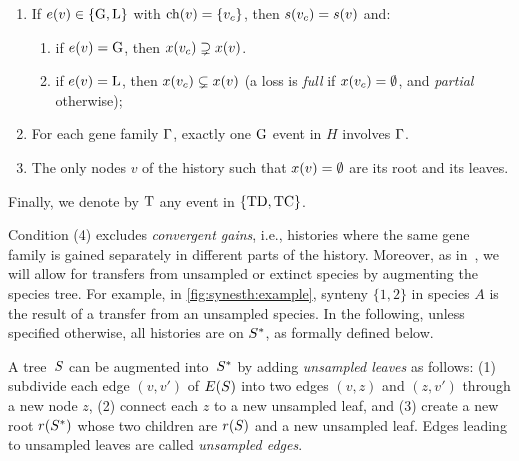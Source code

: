 \begin{definition}
\begin{enumerate}
        \item If \(e(v) \in \{\mathrm{G}, \mathrm{L}\}\)
            with \(\mathrm{ch}(v) = \{v_c\}\),
            then \(s(v_c) = s(v)\) and:

        \begin{enumerate}
            \item if \(e(v) = \mathrm{G}\),
                then \(x(v_c) \supsetneq x(v)\).
                
            \item if \(e(v) = \mathrm{L}\),
                then \(x(v_c) \subsetneq x(v)\)
                (a loss is \emph{full} if \(x(v_c) = \emptyset\),
                and \emph{partial} otherwise);
        \end{enumerate}

        \item\label{def:synesth:hist-gain-once}
            For each gene family \(\Gamma\), exactly one \(\mathrm{G}\) event in \(H\) involves \(\Gamma\).

        \item The only nodes \(v\) of the history such that \(x(v) = \emptyset\) are its root and its leaves.
    \end{enumerate}
    
    Finally, we denote by \(\mathrm{T}\) any event in \(\{\mathrm{TD}, \mathrm{TC}\}\).
\end{definition}

Condition (4) excludes \emph{convergent gains}, i.e., histories where the same gene family is gained separately in different parts of the history.
Moreover, as in~\textcite{Weiner2021ImprovedDuplicationTransfer}, we will allow for transfers from unsampled or extinct species by augmenting the species tree. For example, in \cref{fig:synesth:example}, synteny \(\{1,2\}\) in species \(A\) is the result of a transfer from an unsampled species.
In the following, unless specified otherwise, all histories are on \(S^*\), as formally defined below.

\begin{definition}\label{def:augmented-species}
    A tree~\(S\) can be augmented into~\(S^*\) by adding \emph{unsampled leaves} as follows:
    (1) subdivide each edge \((v, v')\) of \(E(S)\) into two edges \((v, z)\) and \((z, v')\) through a new node \(z\),
    (2) connect each \(z\) to a new unsampled leaf, and
    (3) create a new root \(r(S^*)\) whose two children are \(r(S)\) and a new unsampled leaf.
    Edges leading to unsampled leaves are called \emph{unsampled edges}.
\end{definition}

